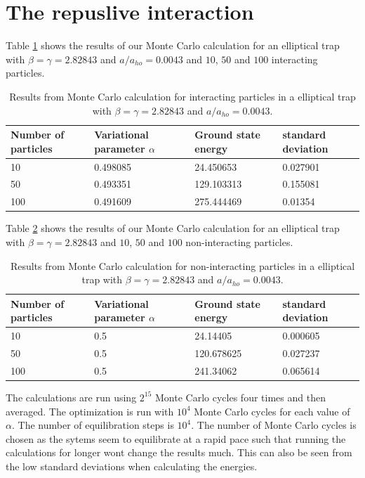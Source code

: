 \documentclass[a4paper, 10pt, english]{revtex4-2} %
\begin{document}
\section{\large The repuslive interaction}
    Table \ref{results 1} shows the results of our Monte Carlo calculation for an elliptical trap with $\beta = \gamma = 2.82843$ and $a/a_{ho} = 0.0043$ and $10$, $50$ and $100$ interacting particles.
    \begin{table}[!ht]
        \begin{tabular}{|l|l|l|l|}
        \hline
        Number of particles & Variational parameter $\alpha$    & Ground state energy   & standard deviation   \\ \hline
        10                  & 0.498085                          & 24.450653             & 0.027901             \\ \hline
        50                  & 0.493351                          & 129.103313            & 0.155081             \\ \hline
        100                 & 0.491609                          & 275.444469            & 0.01354              \\ \hline
        \end{tabular}
        \caption{Results from Monte Carlo calculation for interacting particles in a elliptical trap with $\beta = \gamma = 2.82843$ and $a/a_{ho} = 0.0043$.}
        \label{results 1}
    \end{table}
    Table \ref{results 2} shows the results of our Monte Carlo calculation for an elliptical trap with $\beta = \gamma = 2.82843$ and $10$, $50$ and $100$ non-interacting particles.
    \begin{table}[!ht]
        \begin{tabular}{|l|l|l|l|}
        \hline
        Number of particles & Variational parameter $\alpha$    & Ground state energy   & standard deviation   \\ \hline
        10                  & 0.5                               & 24.14405              & 0.000605             \\ \hline
        50                  & 0.5                               & 120.678625            & 0.027237             \\ \hline
        100                 & 0.5                               & 241.34062             & 0.065614             \\ \hline
        \end{tabular}
        \caption{Results from Monte Carlo calculation for non-interacting particles in a elliptical trap with $\beta = \gamma = 2.82843$ and $a/a_{ho} = 0.0043$.}
        \label{results 2}
    \end{table}
    The calculations are run using $2^{15}$ Monte Carlo cycles four times and then averaged.
    The optimization is run with $10^4$ Monte Carlo cycles for each value of $\alpha$.
    The number of equilibration steps is $10^4$.
    The number of Monte Carlo cycles is chosen as the sytems seem to equilibrate at a rapid pace such that running the calculations for longer wont change the results much.
    This can also be seen from the low standard deviations when calculating the energies.
\end{document}
